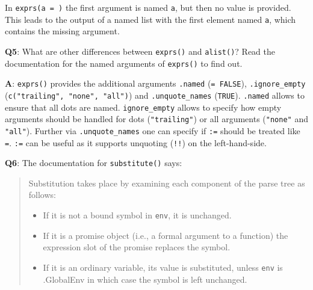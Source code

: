 \documentclass[
]{krantz}
\makeatletter
\newenvironment{Shaded}{\begin{snugshade}}{\end{snugshade}}
\newcommand{\CommentTok}[1]{\textcolor[rgb]{0.56,0.35,0.01}{\textit{#1}}}
\newcommand{\DataTypeTok}[1]{\textcolor[rgb]{0.13,0.29,0.53}{#1}}
\newcommand{\KeywordTok}[1]{\textcolor[rgb]{0.13,0.29,0.53}{\textbf{#1}}}
\newcommand{\NormalTok}[1]{#1}
\newcommand{\OperatorTok}[1]{\textcolor[rgb]{0.81,0.36,0.00}{\textbf{#1}}}
\newcommand{\StringTok}[1]{\textcolor[rgb]{0.31,0.60,0.02}{#1}}
\providecommand{\tightlist}{%
  \setlength{\itemsep}{0pt}\setlength{\parskip}{0pt}}
\newenvironment{kframe}{%
\medskip{}
\setlength{\fboxsep}{.8em}
 \def\at@end@of@kframe{}%
 \ifinner\ifhmode%
  \def\at@end@of@kframe{\end{minipage}}%
  \begin{minipage}{\columnwidth}%
 \fi\fi%
 \def\FrameCommand##1{\hskip\@totalleftmargin \hskip-\fboxsep
 \colorbox{shadecolor}{##1}\hskip-\fboxsep
     \hskip-\linewidth \hskip-\@totalleftmargin \hskip\columnwidth}%
 \MakeFramed {\advance\hsize-\width
   \@totalleftmargin\z@ \linewidth\hsize
   \@setminipage}}%
 {\par\unskip\endMakeFramed%
 \at@end@of@kframe}
\renewenvironment{Shaded}{\begin{kframe}}{\end{kframe}}
\renewcommand{\KeywordTok} [1]{\textcolor[rgb]{0.00,0.44,0.13}{{#1}}}
\renewcommand{\DataTypeTok}[1]{\textcolor[rgb]{0.56,0.13,0.00}{{#1}}}
\renewcommand{\StringTok}  [1]{\textcolor[rgb]{0.25,0.44,0.63}{{#1}}}
\renewcommand{\CommentTok} [1]{\textcolor[rgb]{0.38,0.63,0.69}{{#1}}}
\renewcommand{\NormalTok}  [1]{{#1}}
\makeatother
\begin{document}
In \texttt{exprs(a\ =\ )} the first argument is named \texttt{a}, but then no value is provided. This leads to the output of a named list with the first element named \texttt{a}, which contains the missing argument.

\begin{Shaded}
\end{Shaded}

\textbf{{Q5}}: What are other differences between \texttt{exprs()} and \texttt{alist()}? Read the documentation for the named arguments of \texttt{exprs()} to find out.

\textbf{{A}}: \texttt{exprs()} provides the additional arguments \texttt{.named} (\texttt{=\ FALSE}), \texttt{.ignore\_empty} (\texttt{c("trailing",\ "none",\ "all")}) and \texttt{.unquote\_names} (\texttt{TRUE}). \texttt{.named} allows to ensure that all dots are named. \texttt{ignore\_empty} allows to specify how empty arguments should be handled for dots (\texttt{"trailing"}) or all arguments (\texttt{"none"} and \texttt{"all"}). Further via \texttt{.unquote\_names} one can specify if \texttt{:=} should be treated like \texttt{=}. \texttt{:=} can be useful as it supports unquoting (\texttt{!!}) on the left-hand-side.

\textbf{{Q6}}: The documentation for \texttt{substitute()} says:

\begin{quote}
Substitution takes place by examining each component of the parse tree
as follows:

\begin{itemize}
\tightlist
\item
  If it is not a bound symbol in \texttt{env}, it is unchanged.
\item
  If it is a promise object (i.e., a formal argument to a function) the expression slot of the promise replaces the symbol.
\item
  If it is an ordinary variable, its value is substituted, unless \texttt{env} is .GlobalEnv in which case the symbol is left unchanged.
\end{itemize}
\end{quote}
\end{document}
